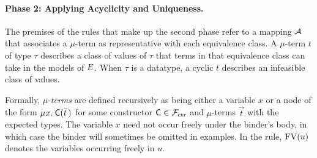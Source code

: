 \paragraph{Phase 2: Applying Acyclicity and Uniqueness.}
The premises of the rules that make up the second phase refer to a mapping $\mathcal{A}$
that associates a $\mu$-term as representative with each equivalence class.
A $\mu$-term $t$ of type $\tau$ describes a class of values of
$\tau$ that terms in that equivalence class can take in the models of $E$.
When $\tau$ is a datatype, %
a cyclic $t$ describes an infeasible class of values.

Formally, $\mu$-\emph{terms} are defined recursively as being either a variable $x$
or a node of the form
$\MU x.\: \const{C}( \vec t\, )$ for some constructor $\textsf{C} \in \mathcal{F}_{\mathrm{ctr}}$ and
$\mu$-terms $\vec t$ with the expected types.
The variable $x$ need not occur freely under the binder's body, in which case the
binder will sometimes be omitted in examples.
In the  rule,
$\mathrm{FV}( u )$ denotes the variables occurring freely in $u$.

%


